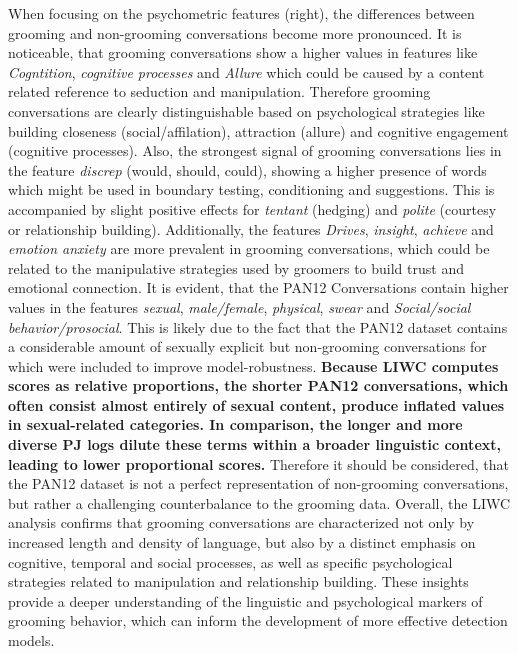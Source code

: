 When focusing on the psychometric features (right), the differences between grooming and non-grooming conversations become more pronounced. It is noticeable, that grooming conversations show a higher values in features like \textit{Cogntition}, \textit{cognitive processes} and \textit{Allure} which could be caused by a content related reference to seduction and manipulation. Therefore grooming conversations are clearly distinguishable based on psychological strategies like building closeness (social/affilation), attraction (allure) and cognitive engagement (cognitive processes). Also, the strongest signal of grooming conversations lies in the feature \textit{discrep} (would, should, could), showing a higher presence of words which might be used in boundary testing, conditioning and suggestions. This is accompanied by slight positive effects for \textit{tentant} (hedging) and \textit{polite} (courtesy or relationship building). Additionally, the features \textit{Drives}, \textit{insight}, \textit{achieve} and \textit{emotion anxiety} are more prevalent in grooming conversations, which could be related to the manipulative strategies used by groomers to build trust and emotional connection.
It is evident, that the PAN12 Conversations contain higher values in the features \textit{sexual}, \textit{male/female}, \textit{physical}, \textit{swear} and \textit{Social/social behavior/prosocial}. This is likely due to the fact that the PAN12 dataset contains a considerable amount of sexually explicit but non-grooming conversations for which were included to improve model-robustness. \textbf{Because LIWC computes scores as relative proportions, the shorter PAN12 conversations, which often consist almost entirely of sexual content, produce inflated values in sexual-related categories. In comparison, the longer and more diverse PJ logs dilute these terms within a broader linguistic context, leading to lower proportional scores.} Therefore it should be considered, that the PAN12 dataset is not a perfect representation of non-grooming conversations, but rather a challenging counterbalance to the grooming data. Overall, the LIWC analysis confirms that grooming conversations are characterized not only by increased length and density of language, but also by a distinct emphasis on cognitive, temporal and social processes, as well as specific psychological strategies related to manipulation and relationship building. These insights provide a deeper understanding of the linguistic and psychological markers of grooming behavior, which can inform the development of more effective detection models.


